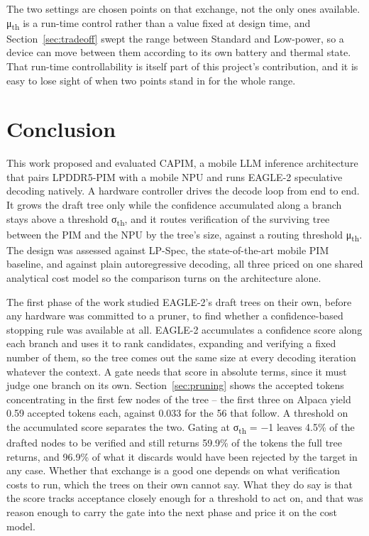 \documentclass[11pt]{article}
\begin{document}
The two settings are chosen points on that exchange, not the only ones available. μ\textsubscript{th} is a run-time control rather than a value fixed at design time, and Section~\ref{sec:tradeoff} swept the range between Standard and Low-power, so a device can move between them according to its own battery and thermal state. That run-time controllability is itself part of this project's contribution, and it is easy to lose sight of when two points stand in for the whole range.

\newpage
\section{Conclusion}

This work proposed and evaluated CAPIM, a mobile LLM inference architecture that pairs LPDDR5-PIM with a mobile NPU and runs EAGLE-2 speculative decoding natively. A hardware controller drives the decode loop from end to end. It grows the draft tree only while the confidence accumulated along a branch stays above a threshold σ\textsubscript{th}, and it routes verification of the surviving tree between the PIM and the NPU by the tree's size, against a routing threshold μ\textsubscript{th}. The design was assessed against LP-Spec, the state-of-the-art mobile PIM baseline, and against plain autoregressive decoding, all three priced on one shared analytical cost model so the comparison turns on the architecture alone.

The first phase of the work studied EAGLE-2's draft trees on their own, before any hardware was committed to a pruner, to find whether a confidence-based stopping rule was available at all. EAGLE-2 accumulates a confidence score along each branch and uses it to rank candidates, expanding and verifying a fixed number of them, so the tree comes out the same size at every decoding iteration whatever the context. A gate needs that score in absolute terms, since it must judge one branch on its own. Section~\ref{sec:pruning} shows the accepted tokens concentrating in the first few nodes of the tree -- the first three on Alpaca yield 0.59 accepted tokens each, against 0.033 for the 56 that follow. A threshold on the accumulated score separates the two. Gating at σ\textsubscript{th} = −1 leaves 4.5\% of the drafted nodes to be verified and still returns 59.9\% of the tokens the full tree returns, and 96.9\% of what it discards would have been rejected by the target in any case. Whether that exchange is a good one depends on what verification costs to run, which the trees on their own cannot say. What they do say is that the score tracks acceptance closely enough for a threshold to act on, and that was reason enough to carry the gate into the next phase and price it on the cost model.
\end{document}
